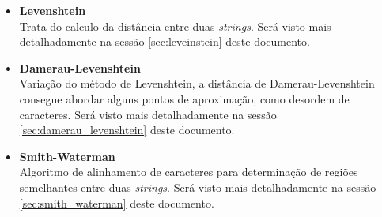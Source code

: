 \begin{itemize}
	\item \textbf{Levenshtein}\\
	Trata do calculo da distância entre duas \textit{strings}. Será visto mais detalhadamente na sessão \ref{sec:leveinstein} deste documento.
%
	\item \textbf{Damerau-Levenshtein}\\
	Variação do método de Levenshtein, a distância de Damerau-Levenshtein consegue abordar alguns pontos de aproximação, como desordem de caracteres. Será visto mais detalhadamente na sessão \ref{sec:damerau_levenshtein} deste documento.
%
	\item \textbf{Smith-Waterman}\\
	Algoritmo de alinhamento de caracteres para determinação de regiões semelhantes entre duas \textit{strings}. Será visto mais detalhadamente na sessão \ref{sec:smith_waterman} deste documento.

\end{itemize}
